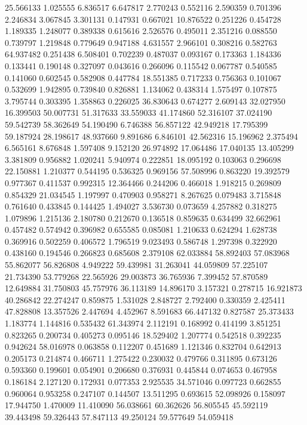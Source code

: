 25.566133
1.025555
6.836517
6.647817
2.770243
0.552116
2.590359
0.701396
2.246834
3.067845
3.301131
0.147931
0.667021
10.876522
0.251226
0.454728
1.189335
1.248077
0.389338
0.615616
2.526576
0.495011
2.351216
0.088550
0.739797
1.219848
0.779649
0.947188
4.631557
2.966101
0.308216
0.582763
64.937482
0.251438
6.508401
0.702239
0.487037
0.093167
0.173363
1.184336
0.133441
0.190148
0.327097
0.043616
0.266096
0.115542
0.067787
0.540585
0.141060
0.602545
0.582908
0.447784
18.551385
0.717233
0.756363
0.101067
0.532699
1.942895
0.739840
0.826881
1.134062
0.438314
1.575497
0.107875
3.795744
0.303395
1.358863
0.226025
36.830643
0.674277
2.609143
32.027950
16.399503
50.007731
51.317633
33.559033
41.174860
52.316107
37.024190
59.542739
58.362649
54.190490
6.746388
56.857122
42.949218
17.795399
59.187924
28.198617
48.937660
9.891686
6.846101
42.562316
15.196962
2.375494
6.565161
8.676848
1.597408
9.152120
26.974892
17.064486
17.040135
13.405299
3.381809
0.956882
1.020241
5.940974
0.222851
18.095192
0.103063
0.296698
22.150881
1.210377
0.544195
0.536325
0.969156
57.508996
0.863220
19.392579
0.977367
0.411537
0.992315
12.364466
0.244206
0.466018
1.918215
0.269809
0.854329
21.034545
1.197997
0.470903
0.958271
8.267625
0.079483
3.715848
0.761640
0.433845
0.144425
1.494027
3.536730
0.073659
4.257882
0.318275
1.079896
1.215136
2.180780
0.212670
0.136518
0.859635
0.634499
32.662961
0.457482
0.574942
0.396982
0.655585
0.085081
1.210633
0.624294
1.628738
0.369916
0.502259
0.406572
1.796519
9.023493
0.586748
1.297398
0.322920
0.438160
0.194546
0.266823
0.685608
2.379108
62.033884
58.892403
57.083968
55.862077
56.826808
4.949222
59.439981
31.263041
44.059809
57.225107
21.734390
53.779268
22.565926
29.003873
36.765936
7.399452
57.870589
12.649884
31.750803
45.757976
36.113189
14.896170
3.157321
0.278715
16.921873
40.286842
22.274247
0.859875
1.531028
2.848727
2.792400
0.330359
2.425411
47.828808
13.357526
2.447694
4.452967
8.591683
66.447132
0.827587
25.373433
1.183774
1.144816
0.535432
61.343974
2.112191
0.168992
0.414199
3.851251
0.823265
0.200734
0.405273
0.095146
18.529402
1.207774
0.542518
0.392235
0.942624
58.016978
0.063858
0.112207
0.451689
1.121346
0.832704
0.642913
0.205173
0.214874
0.466711
1.275422
0.230032
0.479766
0.311895
0.673126
0.593360
0.199601
0.054901
0.206680
0.376931
0.445844
0.074653
0.467958
0.186184
2.127120
0.172931
0.077353
2.925535
34.571046
0.097723
0.662855
0.960064
0.953258
0.247107
0.144507
13.511295
0.693615
52.098926
0.158097
17.944750
1.470009
11.410090
56.038661
60.362626
56.805545
45.592119
39.443498
59.326443
57.847113
49.250124
59.577649
54.059418
